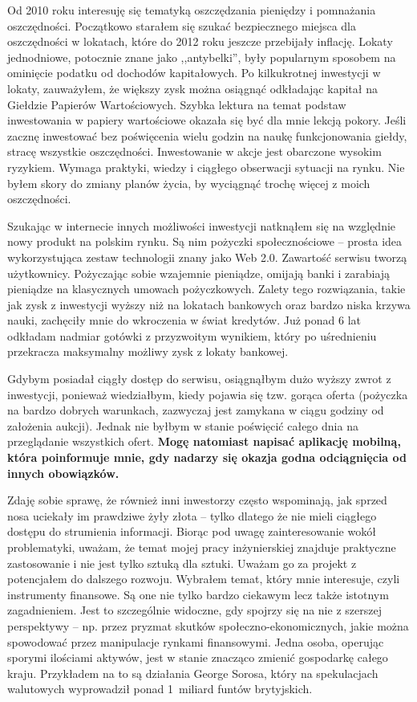 \documentclass[a4paper,twoside,titlepage,openright]{book}
\begin{document}
Od 2010 roku interesuję się tematyką oszczędzania pieniędzy i pomnażania oszczędności. Początkowo starałem się szukać bezpiecznego miejsca dla oszczędności w lokatach, które do 2012 roku jeszcze przebijały inflację. Lokaty jednodniowe, potocznie znane jako ,,antybelki'', były popularnym sposobem na ominięcie podatku od dochodów kapitałowych. Po kilkukrotnej inwestycji w lokaty, zauważyłem, że większy zysk można osiągnąć odkładając kapitał na Giełdzie Papierów Wartościowych. Szybka lektura na temat podstaw inwestowania w papiery wartościowe okazała się być dla mnie lekcją pokory. Jeśli zacznę inwestować bez poświęcenia wielu godzin na naukę funkcjonowania giełdy, stracę wszystkie oszczędności. Inwestowanie w akcje jest obarczone wysokim ryzykiem. Wymaga praktyki, wiedzy i ciągłego obserwacji sytuacji na rynku. Nie byłem skory do zmiany planów życia, by wyciągnąć trochę więcej z moich oszczędności. 

Szukając w internecie innych możliwości inwestycji natknąłem się na względnie nowy produkt na polskim rynku. Są nim pożyczki społecznościowe -- prosta idea wykorzystująca zestaw technologii znany jako Web 2.0. Zawartość serwisu tworzą użytkownicy. Pożyczając sobie wzajemnie pieniądze, omijają banki i zarabiają pieniądze na klasycznych umowach pożyczkowych. Zalety tego rozwiązania, takie jak zysk z inwestycji wyższy niż na lokatach bankowych oraz bardzo niska krzywa nauki, zachęciły mnie do wkroczenia w świat kredytów. Już ponad 6 lat odkładam nadmiar gotówki z przyzwoitym wynikiem, który po uśrednieniu przekracza maksymalny możliwy zysk z lokaty bankowej. 

Gdybym posiadał ciągły dostęp do serwisu, osiągnąłbym dużo wyższy zwrot z inwestycji, ponieważ wiedziałbym, kiedy pojawia się tzw. gorąca oferta (pożyczka na bardzo dobrych warunkach, zazwyczaj jest zamykana w ciągu godziny od założenia aukcji). Jednak nie byłbym w stanie poświęcić całego dnia na przeglądanie wszystkich ofert. \textbf{Mogę natomiast napisać aplikację mobilną, która poinformuje mnie, gdy nadarzy się okazja godna odciągnięcia od innych obowiązków.} 

Zdaję sobie sprawę, że również inni inwestorzy często wspominają, jak sprzed nosa uciekały im prawdziwe żyły złota -- tylko dlatego że nie mieli ciągłego dostępu do strumienia informacji. Biorąc pod uwagę zainteresowanie wokół problematyki, uważam, że temat mojej pracy inżynierskiej znajduje praktyczne zastosowanie i nie jest tylko sztuką dla sztuki. Uważam go za projekt z potencjałem do dalszego rozwoju. Wybrałem temat, który mnie interesuje, czyli instrumenty finansowe. Są one nie tylko bardzo ciekawym lecz także istotnym zagadnieniem. Jest to szczególnie widoczne, gdy spojrzy się na nie z szerszej perspektywy -- np. przez pryzmat skutków społeczno-ekonomicznych, jakie można spowodować przez manipulacje rynkami finansowymi. Jedna osoba, operując sporymi ilościami aktywów, jest w stanie znacząco zmienić gospodarkę całego kraju. Przykładem na to są działania George Sorosa, który na spekulacjach walutowych wyprowadził ponad 1~miliard funtów brytyjskich.\cite{soros}
\end{document}
